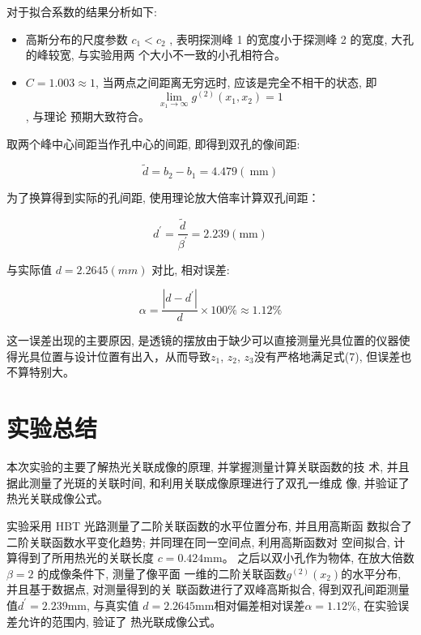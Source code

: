 \documentclass[12pt,a4paper]{article}
\newcommand{\be}[1]{
    \begin{equation}
        #1
    \end{equation}
}
\begin{document}
对于拟合系数的结果分析如下:
\begin{itemize}
\item 高斯分布的尺度参数 $c_1 < c_2$ , 表明探测峰 1 的宽度小于探测峰 2 的宽度, 大孔的峰较宽, 与实验用两
个大小不一致的小孔相符合。
\item $C = 1.003 \approx 1$, 当两点之间距离无穷远时, 应该是完全不相干的状态, 即 $$\lim _{x_{1} \rightarrow \infty} g^{(2)}\left(x_{1}, x_{2}\right)=1$$, 与理论
预期大致符合。
\end{itemize}
取两个峰中心间距当作孔中心的间距, 即得到双孔的像间距:
\be{\tilde{d}=b_{2}-b_{1}=4.479(\mathrm{~mm})}
为了换算得到实际的孔间距, 使用理论放大倍率计算双孔间距：
\be{d^{\prime}=\frac{\tilde{d}}{\beta^{\prime}}=2.239(\mathrm{mm})}
与实际值 $d = 2.2645(mm)$ 对比, 相对误差:
\be{\alpha=\frac{|d-d^{\prime}|}{d} \times 100 \% \approx 1.12 \%}
这一误差出现的主要原因, 是透镜的摆放由于缺少可以直接测量光具位置的仪器使得光具位置与设计位置有出入，从而导致$z_1$, $z_2$, $z_3$没有严格地满足式(7), 但误差也不算特别大。
\section{实验总结}
本次实验的主要了解热光关联成像的原理, 并掌握测量计算关联函数的技
术, 并且据此测量了光斑的关联时间, 和利用关联成像原理进行了双孔一维成
像, 并验证了热光关联成像公式。

实验采用 HBT 光路测量了二阶关联函数的水平位置分布, 并且用高斯函
数拟合了二阶关联函数水平变化趋势; 并同理在同一空间点, 利用高斯函数对
空间拟合, 计算得到了所用热光的关联长度 $c = 0.424 \mathrm{mm}$。
之后以双小孔作为物体, 在放大倍数 $\beta = 2$ 的成像条件下, 测量了像平面
一维的二阶关联函数$ g^{(2)}(x_2) $的水平分布, 并且基于数据点, 对测量得到的关
联函数进行了双峰高斯拟合, 得到双孔间距测量值$ d^{\prime} = 2.239\mathrm{mm}$, 与真实值
$d = 2.2645\mathrm{mm} $相对偏差相对误差$ \alpha = 1.12\%$, 
在实验误差允许的范围内, 验证了
热光联成像公式。
\end{document}
